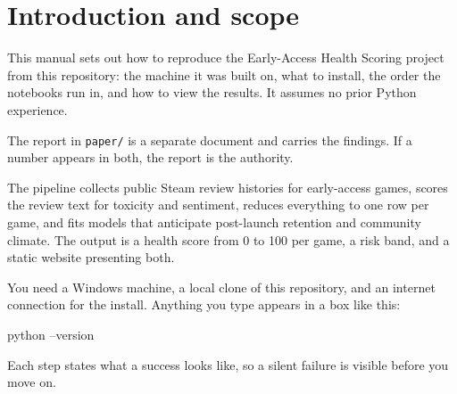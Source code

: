 \section{Introduction and scope}
\label{sec:intro}

This manual sets out how to reproduce the Early-Access Health Scoring project from this repository:
the machine it was built on, what to install, the order the notebooks run in, and how to
view the results. It assumes no prior Python experience.

The report in \texttt{paper/} is a separate document and carries the findings. If a number appears
in both, the report is the authority.

The pipeline collects public Steam review histories for early-access games, scores the review text
for toxicity and sentiment, reduces everything to one row per game, and fits models that anticipate
post-launch retention and community climate. The output is a health score from 0 to 100 per game, a
risk band, and a static website presenting both.

You need a Windows machine, a local clone of this repository, and an internet connection for the
install. Anything you type appears in a box like this:

\begin{cmd}
python --version
\end{cmd}

\noindent Each step states what a success looks like, so a silent failure is visible before you
move on.
